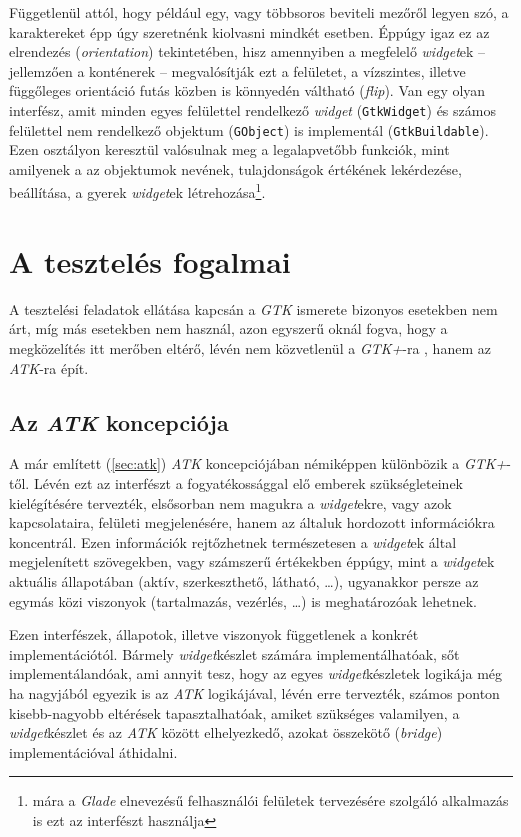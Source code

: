 Függetlenül attól, hogy például egy, vagy többsoros beviteli mezőről legyen szó, a karaktereket épp úgy szeretnénk kiolvasni mindkét esetben. Éppúgy igaz ez az elrendezés (\textit{orientation}) tekintetében, hisz amennyiben a megfelelő \textit{widget}ek -- jellemzően a konténerek -- megvalósítják ezt a felületet, a vízszintes, illetve függőleges orientáció futás közben is könnyedén váltható (\textit{flip}). Van egy olyan interfész, amit minden egyes felülettel rendelkező \textit{widget} (\texttt{GtkWidget}) és számos felülettel nem rendelkező objektum (\texttt{GObject}) is implementál (\texttt{GtkBuildable}). Ezen osztályon keresztül valósulnak meg a legalapvetőbb funkciók, mint amilyenek a az objektumok nevének, tulajdonságok értékének lekérdezése, beállítása, a gyerek \textit{widget}ek létrehozása\footnote{mára a \textit{Glade} elnevezésű felhasználói felületek tervezésére szolgáló alkalmazás is ezt az interfészt használja}.

\section{A tesztelés fogalmai}

A tesztelési feladatok ellátása kapcsán a \textit{GTK} ismerete bizonyos esetekben nem árt, míg más esetekben nem használ, azon egyszerű oknál fogva, hogy a megközelítés itt merőben eltérő, lévén nem közvetlenül a \textit{GTK+}-ra , hanem az \textit{ATK}-ra épít.

\subsection{Az \textit{ATK} koncepciója}

A már említett (\ref{sec:atk}) \textit{ATK} koncepciójában némiképpen különbözik a \textit{GTK+}-től. Lévén ezt az interfészt a fogyatékossággal elő emberek szükségleteinek kielégítésére tervezték, elsősorban nem magukra a \textit{widget}ekre, vagy azok kapcsolataira, felületi megjelenésére, hanem az általuk hordozott információkra koncentrál. Ezen információk rejtőzhetnek természetesen a \textit{widget}ek által megjelenített szövegekben, vagy számszerű értékekben éppúgy, mint a \textit{widget}ek aktuális állapotában (aktív, szerkeszthető, látható, \dots), ugyanakkor persze az egymás közi viszonyok (tartalmazás, vezérlés, \dots) is meghatározóak lehetnek.

Ezen interfészek, állapotok, illetve viszonyok függetlenek a konkrét implementációtól. Bármely \textit{widget}készlet számára implementálhatóak, sőt implementálandóak, ami annyit tesz, hogy az egyes \textit{widget}készletek logikája még ha nagyjából egyezik is az \textit{ATK} logikájával, lévén erre tervezték, számos ponton kisebb-nagyobb eltérések tapasztalhatóak, amiket szükséges valamilyen, a \textit{widget}készlet és az \textit{ATK} között elhelyezkedő, azokat összekötő (\textit{bridge}) implementációval áthidalni.

